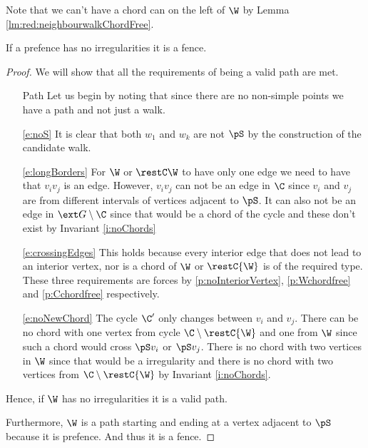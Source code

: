   Note that we can't have a chord can on the left of $\W$ by Lemma \ref{lm:red:neighbourwalkChordFree}.


  \begin{lemma}
    \label{lm:red:regularPrefenceIsFence}
    If a prefence has no irregularities it is a fence.
  \end{lemma}
  \begin{proof}
    We will show that all the requirements of being a valid path are met.
   \begin{itemize}
     \item [Path] Let us begin by noting that since there are no non-simple points we have a path and not just a walk.

     \item[\ref{e:noS}] It is clear that both $w_1$ and $w_k$ are not $\pS$ by the construction of the candidate walk.

     \item[\ref{e:longBorders}] For $\W$ or $\restC \W$ to have only one edge we need to have that $v_i v_j$ is an edge. However, $v_i v_j$ can not be an edge in $\C$ since $v_i$ and $v_j$ are from different intervals of vertices adjacent to $\pS$. It can also not be an edge in $\ext G \setminus \C$ since that would be a chord of the cycle and these don't exist by Invariant \ref{i:noChords}

     \item[\ref{e:crossingEdges}]
     This holds because every interior edge that does not lead to an interior vertex, nor is a chord of $\W$ or $\restC{\W}$ is of the required type. These three requirements are forces by \ref{p:noInteriorVertex}, \ref{p:Wchordfree} and \ref{p:Cchordfree} respectively.

     \item[\ref{e:noNewChord}] The cycle $\C'$ only changes between $v_i$ and $v_j$. There can be no chord with one vertex from cycle $\C \setminus \restC{\W}$ and one from $\W$ since such a chord would cross $\pS v_i$ or $\pS v_j$. There is no chord with two vertices in $\W$ since that would be a irregularity and there is no chord with two vertices from $\C \setminus \restC{\W}$ by Invariant \ref{i:noChords}.
   \end{itemize}
   Hence, if $\W$ has no irregularities it is a valid path.

   Furthermore, $\W$ is a path starting and ending at a vertex adjacent to $\pS$ because it is prefence. And thus it is a fence.
  \end{proof}


